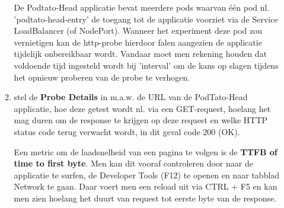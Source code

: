 \begin{enumerate}
\begin{enumerate}
            De Podtato-Head applicatie bevat meerdere pods waarvan één pod nl. 'podtato-head-entry' de toegang tot de applicatie voorziet via de Service LoadBalancer (of NodePort). Wanneer het experiment deze pod zou vernietigen kan de http-probe hierdoor falen aangezien de applicatie tijdelijk onbereikbaar wordt. Vandaar moet men rekening houden dat voldoende tijd ingesteld wordt bij 'interval' om de kans op slagen tijdens het opnieuw proberen van de probe te verhogen.  
            
            \item stel de {\bf Probe Details} in m.a.w. de URL van de PodTato-Head applicatie, hoe deze getest wordt nl. via een GET-request, hoelang het mag duren om de response te krijgen op deze request en welke HTTP status code terug verwacht wordt, in dit geval code 200 (OK).
            
            Een metric om de laadsnelheid van een pagina te volgen is de {\bf TTFB of time to first byte}. Men kan dit vooraf controleren door naar de applicatie te surfen, de Developer Tools (F12) te openen en naar tabblad Network te gaan. Daar voert men een reload uit via CTRL + F5 en kan men zien hoelang het duurt van request tot eerste byte van de response. \autocite{Mensink2022}
            

\end{enumerate}
\end{enumerate}
